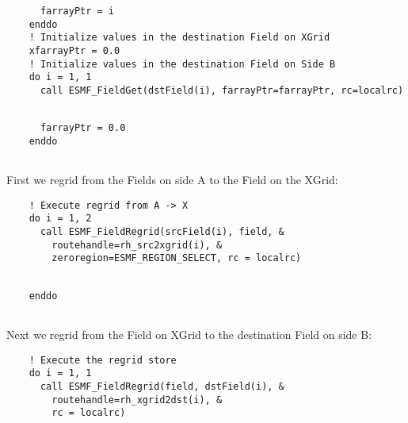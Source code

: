 
 \begin{verbatim}
      farrayPtr = i
    enddo
    ! Initialize values in the destination Field on XGrid
    xfarrayPtr = 0.0
    ! Initialize values in the destination Field on Side B
    do i = 1, 1
      call ESMF_FieldGet(dstField(i), farrayPtr=farrayPtr, rc=localrc)
 
\end{verbatim}
 

 \begin{verbatim}
      farrayPtr = 0.0
    enddo
 
\end{verbatim}
 

   First we regrid from the Fields on side A to the Field on the XGrid: 

 \begin{verbatim}
    ! Execute regrid from A -> X
    do i = 1, 2
      call ESMF_FieldRegrid(srcField(i), field, &
        routehandle=rh_src2xgrid(i), &
        zeroregion=ESMF_REGION_SELECT, rc = localrc)
 
\end{verbatim}
 

 \begin{verbatim}
    enddo
 
\end{verbatim}
 

   Next we regrid from the Field on XGrid to the destination Field on side B: 

 \begin{verbatim}
    ! Execute the regrid store
    do i = 1, 1
      call ESMF_FieldRegrid(field, dstField(i), &
        routehandle=rh_xgrid2dst(i), &
        rc = localrc)
 
\end{verbatim}
 

